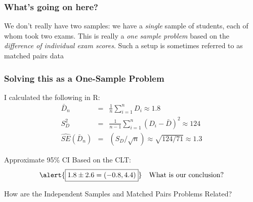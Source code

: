 \documentclass[handout]{beamer}
\begin{document}
\begin{frame}
\frametitle{What's going on here?}

We don't really have two samples: we have a \emph{single} sample of students, each of whom took two exams. This is really a \emph{one sample problem} based on the \emph{difference of individual exam scores}. Such a setup is sometimes referred to as \alert{matched pairs data}

\vspace{2em}


\end{frame}
\begin{frame}
\frametitle{Solving this as a One-Sample Problem}
\small
{}

\vspace{2em}
I calculated the following in R:
	\begin{eqnarray*}
	\bar{D}_n &=& \frac{1}{n}\sum_{i=1}^n D_i \approx 1 .8\\
	S^2_D &=& \frac{1}{n-1}\sum_{i=1}^n (D_i - \bar{D})^2 \approx 	124\\ 
	\widehat{SE}(\bar{D}_n) &=&(S_D /\sqrt{n}) \approx \sqrt{124/71} \approx 1.3 
	\end{eqnarray*}
	
\vspace{1em}
\alert{Approximate 95\% CI Based on the CLT:}
$$\alert{\boxed{1.8 \pm 2.6 = (-0.8, 4.4)}} \quad \mbox{What is our conclusion?}$$

\end{frame}
\begin{frame}
	\begin{center}
	\Huge How are the Independent Samples and Matched Pairs Problems Related?
	\end{center}
\end{frame}
\end{document}
